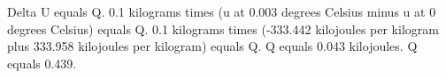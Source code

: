 Delta U equals Q.  
0.1 kilograms times (u at 0.003 degrees Celsius minus u at 0 degrees Celsius) equals Q.  
0.1 kilograms times (-333.442 kilojoules per kilogram plus 333.958 kilojoules per kilogram) equals Q.  
Q equals 0.043 kilojoules.  
Q equals 0.439.
